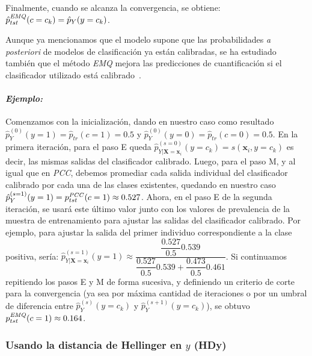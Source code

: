 Finalmente, cuando se alcanza la convergencia, se obtiene: \(\hat p^{\it EMQ
\/}_{tst}(c=c_k) = \hat p_{Y}(y=c_k)\).

Aunque ya mencionamos que el modelo supone que las probabilidades {\it a
posteriori\/} de modelos de clasificación ya están calibradas, se ha estudiado
también que el método {\it EMQ\/} mejora las predicciones de cuantificación si
el clasificador utilizado está calibrado~\cite{esuli2020critical,
alexandari2020maximum}.

\paragraph{\it Ejemplo:\/} Comenzamos con la inicialización, dando en nuestro
caso como resultado \(\hat p^{(0)}_{Y}(y=1) = \hat p_{tr}(c=1) = 0.5\) y \(\hat
p^{(0)}_{Y}(y=0) = \hat p_{tr}(c=0) = 0.5\). En la primera iteración, para el
paso E queda \(\hat p^{(s=0)}_{Y|\boldsymbol{X}=\boldsymbol{x}_i}(y=c_k) =
s(\boldsymbol{x}_i, y=c_k)\) es decir, las mismas salidas del clasificador
calibrado. Luego, para el paso M, y al igual que en {\it PCC}, debemos promediar
cada salida individual del clasificador calibrado por cada una de las clases
existentes, quedando en nuestro caso \(\hat p^{(s=1)}_{Y}(y=1) = p^{\it
PCC\/}_{tst}(c=1) \approx 0.527\). Ahora, en el paso E de la segunda iteración,
se usará este último valor junto con los valores de prevalencia de la muestra de
entrenamiento para ajustar las salidas del clasificador calibrado. Por ejemplo,
para ajustar la salida del primer individuo correspondiente a la clase positiva,
sería: \(\hat p^{(s=1)}_{Y|\boldsymbol{X}=\boldsymbol{x}_i}(y=1) \approx
\dfrac{\dfrac{0.527}{0.5}0.539}{\dfrac{0.527}{0.5}0.539+\dfrac{0.473}{0.5}0.461}\).
Si continuamos repitiendo los pasos E y M de forma sucesiva, y definiendo un
criterio de corte para la convergencia (ya sea por máxima cantidad de
iteraciones o por un umbral de diferencia entre \(\hat p^{(s)}_{Y}(y=c_k)\) y
\(\hat p^{(s+1)}_{Y}(y=c_k)\)), se obtuvo \(p^{\it EMQ \/}_{tst}(c=1) \approx
0.164\).

\subsubsection{Usando la distancia de Hellinger en \(y\)
(HDy)}\label{estimacion:hdy}

